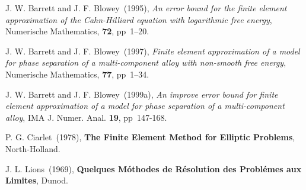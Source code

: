 \begin{thebibliography}{999}
J. W. Barrett and J. F. Blowey~(1995),  
{\it An error bound for the finite element approximation of the Cahn-Hilliard equation with logarithmic free energy}, 
Numerische Mathematics, 
{\bf 72}, pp~1--20.

J. W. Barrett and J. F. Blowey~(1997),  
{\it Finite element approximation of a model for phase separation of a multi-component alloy with non-smooth free energy}, 
Numerische Mathematics, 
{\bf 77}, pp~1--34.

J. W. Barrett and J. F. Blowey~(1999a),  
{\it An improve error bound for finite element approximation of a
model for phase separation of a multi-component alloy}, 
IMA J. Numer. Anal.  
{\bf 19}, pp~147-168.

P. G. Ciarlet~(1978),
{\bf The Finite Element Method for Elliptic Problems}, 
North-Holland. 

J. L. Lions~(1969),
{\bf Quelques M\'othodes de R\'esolution
des Probl\'emes aux Limites}, 
Dunod.
\end{thebibliography}




